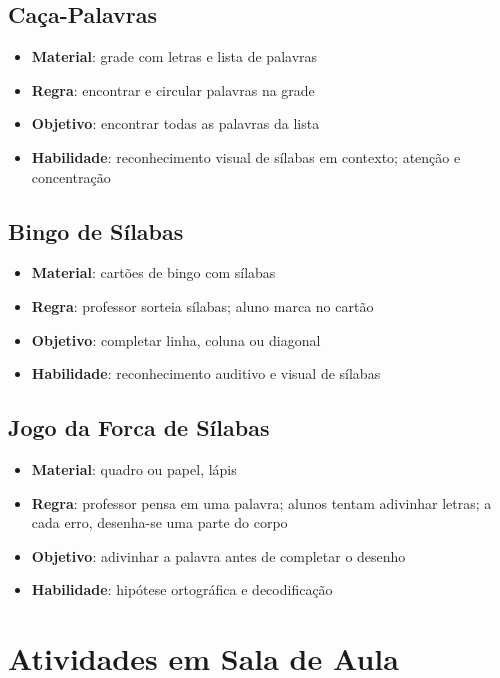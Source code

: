 \subsection{Ca\c{c}a-Palavras}
\begin{itemize}[leftmargin=2cm]
  \item \textbf{Material}: grade com letras e lista de palavras
  \item \textbf{Regra}: encontrar e circular palavras na grade
  \item \textbf{Objetivo}: encontrar todas as palavras da lista
  \item \textbf{Habilidade}: reconhecimento visual de s\'{i}labas em
  contexto; aten\c{c}\~{a}o e concentra\c{c}\~{a}o
\end{itemize}

\subsection{Bingo de S\'{i}labas}
\begin{itemize}[leftmargin=2cm]
  \item \textbf{Material}: cart\~{o}es de bingo com s\'{i}labas
  \item \textbf{Regra}: professor sorteia s\'{i}labas; aluno marca no cart\~{a}o
  \item \textbf{Objetivo}: completar linha, coluna ou diagonal
  \item \textbf{Habilidade}: reconhecimento auditivo e visual de s\'{i}labas
\end{itemize}

\subsection{Jogo da Forca de S\'{i}labas}
\begin{itemize}[leftmargin=2cm]
  \item \textbf{Material}: quadro ou papel, l\'{a}pis
  \item \textbf{Regra}: professor pensa em uma palavra; alunos tentam
  adivinhar letras; a cada erro, desenha-se uma parte do corpo
  \item \textbf{Objetivo}: adivinhar a palavra antes de completar o desenho
  \item \textbf{Habilidade}: hip\'{o}tese ortogr\'{a}fica e decodifica\c{c}\~{a}o
\end{itemize}

\section{Atividades em Sala de Aula}

